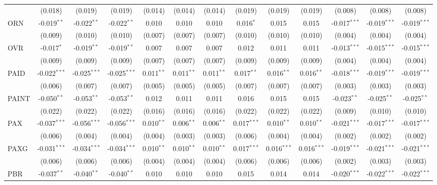 \begin{table}[!htbp]
\begin{tabular}{@{\extracolsep{5pt}}lcccccccccccc}
  & (0.018) & (0.019) & (0.019) & (0.014) & (0.014) & (0.014) & (0.019) & (0.019) & (0.019) & (0.008) & (0.008) & (0.008) \\
 ORN & -0.019$^{**}$ & -0.022$^{**}$ & -0.022$^{**}$ & 0.010$^{}$ & 0.010$^{}$ & 0.010$^{}$ & 0.016$^{*}$ & 0.015$^{}$ & 0.015$^{}$ & -0.017$^{***}$ & -0.019$^{***}$ & -0.019$^{***}$ \\
  & (0.009) & (0.010) & (0.010) & (0.007) & (0.007) & (0.007) & (0.010) & (0.010) & (0.010) & (0.004) & (0.004) & (0.004) \\
 OVR & -0.017$^{*}$ & -0.019$^{**}$ & -0.019$^{**}$ & 0.007$^{}$ & 0.007$^{}$ & 0.007$^{}$ & 0.012$^{}$ & 0.011$^{}$ & 0.011$^{}$ & -0.013$^{***}$ & -0.015$^{***}$ & -0.015$^{***}$ \\
  & (0.009) & (0.009) & (0.009) & (0.007) & (0.007) & (0.007) & (0.009) & (0.009) & (0.009) & (0.004) & (0.004) & (0.004) \\
 PAID & -0.022$^{***}$ & -0.025$^{***}$ & -0.025$^{***}$ & 0.011$^{**}$ & 0.011$^{**}$ & 0.011$^{**}$ & 0.017$^{**}$ & 0.016$^{**}$ & 0.016$^{**}$ & -0.018$^{***}$ & -0.019$^{***}$ & -0.019$^{***}$ \\
  & (0.006) & (0.007) & (0.007) & (0.005) & (0.005) & (0.005) & (0.007) & (0.007) & (0.007) & (0.003) & (0.003) & (0.003) \\
 PAINT & -0.050$^{**}$ & -0.053$^{**}$ & -0.053$^{**}$ & 0.012$^{}$ & 0.011$^{}$ & 0.011$^{}$ & 0.016$^{}$ & 0.015$^{}$ & 0.015$^{}$ & -0.023$^{**}$ & -0.025$^{**}$ & -0.025$^{**}$ \\
  & (0.022) & (0.022) & (0.022) & (0.016) & (0.016) & (0.016) & (0.022) & (0.022) & (0.022) & (0.009) & (0.010) & (0.010) \\
 PAX & -0.037$^{***}$ & -0.056$^{***}$ & -0.056$^{***}$ & 0.010$^{**}$ & 0.006$^{**}$ & 0.006$^{**}$ & 0.017$^{***}$ & 0.010$^{**}$ & 0.010$^{**}$ & -0.021$^{***}$ & -0.017$^{***}$ & -0.017$^{***}$ \\
  & (0.006) & (0.004) & (0.004) & (0.004) & (0.003) & (0.003) & (0.006) & (0.004) & (0.004) & (0.002) & (0.002) & (0.002) \\
 PAXG & -0.031$^{***}$ & -0.034$^{***}$ & -0.034$^{***}$ & 0.010$^{**}$ & 0.010$^{**}$ & 0.010$^{**}$ & 0.017$^{***}$ & 0.016$^{***}$ & 0.016$^{***}$ & -0.019$^{***}$ & -0.021$^{***}$ & -0.021$^{***}$ \\
  & (0.006) & (0.006) & (0.006) & (0.004) & (0.004) & (0.004) & (0.006) & (0.006) & (0.006) & (0.002) & (0.003) & (0.003) \\
 PBR & -0.037$^{**}$ & -0.040$^{**}$ & -0.040$^{**}$ & 0.010$^{}$ & 0.010$^{}$ & 0.010$^{}$ & 0.015$^{}$ & 0.014$^{}$ & 0.014$^{}$ & -0.020$^{***}$ & -0.022$^{***}$ & -0.022$^{***}$ \\

\end{tabular}
\end{table}
